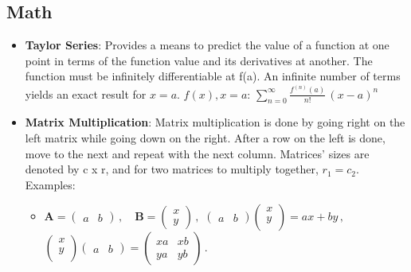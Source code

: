 \documentclass[fontsize=5pt]{scrartcl}
\begin{document}
\begin{multicols}{3}
    \subsection{Math}
      \begin{itemize}
      \item \textbf{Taylor Series}: Provides a means to predict the value of a function at one point in terms of
             the function value and its derivatives at another. The function must be infinitely differentiable
             at f(a). An infinite number of terms yields an exact result for $x=a$.
        $f(x), x=a$: $\sum_{n=0} ^ {\infty} \frac {f^{(n)}(a)}{n!} \, (x-a)^{n}$
      \item \textbf{Matrix Multiplication}: Matrix multiplication is done by going right on the left matrix while going
        down on the right. After a row on the left is done, move to the next and repeat with the next column. Matrices'
        sizes are denoted by c x r, and for two matrices to multiply together, $r_1 = c_2$. Examples:
        \begin{itemize} %
          \item $\mathbf{A} = \begin{pmatrix} 
                a & b
                \end{pmatrix}\,, \quad \mathbf{B} = \begin{pmatrix} 
                x \\
                y 
                \end{pmatrix}\,,
                $
                $
                  \begin{pmatrix} 
                  a & b 
                  \end{pmatrix} \begin{pmatrix} 
                  x \\
                  y \\
                  \end{pmatrix} = ax + by \,,
                $ \\
                $
                  \begin{pmatrix} 
                  x \\
                  y \\
                  \end{pmatrix}\begin{pmatrix} 
                  a & b
                  \end{pmatrix} = \begin{pmatrix} 
                  xa & xb \\
                  ya & yb 
                  \end{pmatrix} \,.
                $

        \end{itemize}
      \end{itemize}
  \end{multicols}
\end{document}
